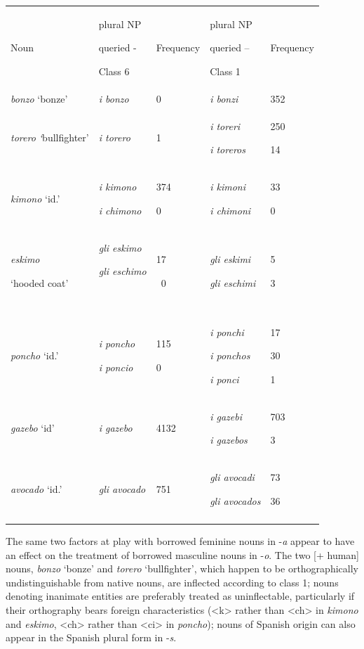 \documentclass[output=paper]{langscibook}
\begin{document}
\begin{tabularx}{\textwidth}{XXXXX}

\lsptoprule

Noun & plural NP 

queried -

Class 6 & Frequency & plural NP 

queried – 

Class 1 & Frequency\\
\textit{bonzo} ‘bonze’ & \textit{i bonzo} & 0 & \textit{i bonzi} & 352\\
\textit{torero ‘}bullfighter’ & \textit{i torero} & 1 & \textit{i toreri}

\textit{i toreros} & 250

14\\
\textit{kimono} ‘id.’ & \textit{i kimono}

\textit{i chimono} & 374

0 & \textit{i kimoni}

\textit{i chimoni} & 33

0\\
\textit{eskimo} 

‘hooded coat’ & \textit{gli eskimo}

\textit{gli eschimo}

\textit{~} & 17

~0 & \textit{gli eskimi} 

\textit{gli eschimi} & 5

3\\
\textit{poncho} ‘id.’ & \textit{i poncho}

\textit{i poncio} & 115

0 & \textit{i ponchi}

\textit{i ponchos}

\textit{i ponci} & 17

30

1\\
\textit{gazebo} ‘id’ & \textit{i gazebo} & 4132 & \textit{i gazebi}

\textit{i gazebos} & 703

3\\
\textit{avocado} ‘id.’ & \textit{gli avocado} & 751 & \textit{gli avocadi} 

\textit{gli avocados} & 73

36\\
\lspbottomrule
\end{tabularx}
The same two factors at play with borrowed feminine nouns in \nobreakdash-\textit{a} appear to have an effect on the treatment of borrowed masculine nouns in \nobreakdash-\textit{o}. The two [+ human] nouns, \textit{bonzo} ‘bonze’ and \textit{torero} ‘bullfighter’, which happen to be orthographically undistinguishable from native nouns, are inflected according to class 1; nouns denoting inanimate entities are preferably treated as uninflectable, particularly if their orthography bears foreign characteristics (<k> rather than <ch> in \textit{kimono} and \textit{eskimo}, <ch> rather than <ci> in \textit{poncho}); nouns of Spanish origin can also appear in the Spanish plural form in \nobreakdash-\textit{s}.
\end{document}
